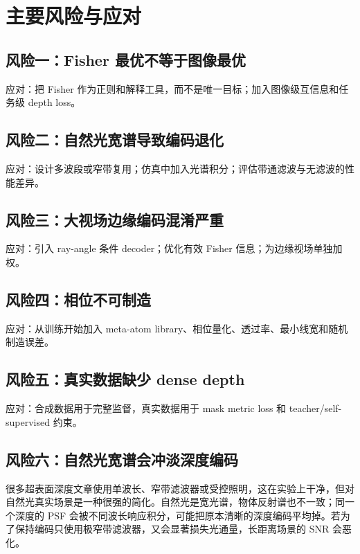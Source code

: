 \documentclass[11pt,a4paper,fontset=none]{ctexart}
\begin{document}
\section{主要风险与应对}

\subsection{风险一：Fisher 最优不等于图像最优}

应对：把 Fisher 作为正则和解释工具，而不是唯一目标；加入图像级互信息和任务级 depth loss。

\subsection{风险二：自然光宽谱导致编码退化}

应对：设计多波段或窄带复用；仿真中加入光谱积分；评估带通滤波与无滤波的性能差异。

\subsection{风险三：大视场边缘编码混淆严重}

应对：引入 ray-angle 条件 decoder；优化有效 Fisher 信息；为边缘视场单独加权。

\subsection{风险四：相位不可制造}

应对：从训练开始加入 meta-atom library、相位量化、透过率、最小线宽和随机制造误差。

\subsection{风险五：真实数据缺少 dense depth}

应对：合成数据用于完整监督，真实数据用于 mask metric loss 和 teacher/self-supervised 约束。

\subsection{风险六：自然光宽谱会冲淡深度编码}

很多超表面深度文章使用单波长、窄带滤波器或受控照明，这在实验上干净，但对自然光真实场景是一种很强的简化。自然光是宽光谱，物体反射谱也不一致；同一个深度的 PSF 会被不同波长响应积分，可能把原本清晰的深度编码平均掉。若为了保持编码只使用极窄带滤波器，又会显著损失光通量，长距离场景的 SNR 会恶化。
\end{document}
